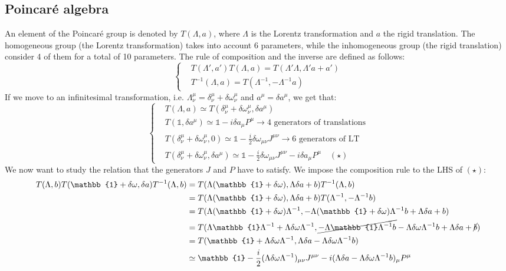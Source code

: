 \documentclass[../main.tex]{subfiles}
\begin{document}
\subsection{Poincaré algebra}
An element of the Poincaré group is denoted by $T(\Lambda,a)$, where $\Lambda$ is the Lorentz transformation and $a$ the rigid translation. The homogeneous group (the Lorentz transformation) takes into account 6 parameters, while the inhomogeneous group (the rigid translation) consider 4 of them for a total of 10 parameters. The rule of composition and the inverse are defined as follows:
\[
\left\{
\begin{aligned}
&T(\Lambda',a')T(\Lambda,a)=T(\Lambda'\Lambda,\Lambda'a+a')\\
&T^{-1}(\Lambda,a)=T(\Lambda^{-1},-\Lambda^{-1}a)
\end{aligned}
\right.
\]
If we move to an infinitesimal transformation, i.e. $\Lambda^{\mu}_{\nu}=\delta^{\mu}_{\nu}+\delta\omega^{\mu}_{\nu}$ and $a^{\mu}=\delta a^{\mu}$, we get that:
\[
\left\{
\begin{aligned}
&T(\Lambda,a)\simeq T(\delta^{\mu}_{\nu}+\delta\omega^{\mu}_{\nu},\delta a^{\mu})\\
&T(\mathbb{1},\delta a^{\mu})\simeq\mathbb{1}-i\delta a_{\mu}P^{\mu}\xrightarrow[]{}\text{4 generators of translations}\\
&T(\delta^{\mu}_{\nu}+\delta\omega^{\mu}_{\nu},0)\simeq\mathbb{1}-\frac{i}{2}
\delta\omega_{\mu\nu}J^{\mu\nu}\xrightarrow[]{}\text{6 generators of LT}\\
&T(\delta^{\mu}_{\nu}+\delta\omega^{\mu}_{\nu},\delta a^{\mu})\simeq\mathbb{1}-\frac{i}{2}\delta\omega_{\mu\nu}J^{\mu\nu}-i\delta a_{\mu}P^{\mu} \quad (\star)
\end{aligned}
\right.
\]
We now want to study the relation that the generators $J$ and $P$ have to satisfy. We impose the composition rule to the LHS of $(\star)$:
\begin{align*}
T(\Lambda,b)T(\mathbb{1}+\delta\omega
,\delta a)T^{-1}(\Lambda,b)&=T(\Lambda(\mathbb{1}+\delta\omega),\Lambda\delta a+b)T^{-1}(\Lambda,b)\\
&=T(\Lambda(\mathbb{1}+\delta\omega),\Lambda\delta a+b)T(\Lambda^{-1},-\Lambda^{-1}b)\\
&=T(\Lambda(\mathbb{1}+\delta\omega)\Lambda^{-1},-\Lambda(\mathbb{1}+\delta\omega)\Lambda^{-1}b+\Lambda\delta a+b)\\
&=T(\Lambda\mathbb{1}\Lambda^{-1}+\Lambda\delta\omega\Lambda^{-1},\cancel{-\Lambda\mathbb{1}\Lambda^{-1}b}-\Lambda\delta\omega\Lambda^{-1}b+\Lambda\delta a+\cancel{b})\\
&=T(\mathbb{1}+\Lambda\delta\omega\Lambda^{-1},\Lambda\delta a-\Lambda\delta\omega\Lambda^{-1}b)\\
&\simeq\mathbb{1}-\frac{i}{2}(\Lambda\delta\omega\Lambda^{-1})_{\mu\nu}J^{\mu\nu}-i(\Lambda\delta a-\Lambda\delta\omega\Lambda^{-1}b)_{\mu}P^{\mu}
\end{align*}
\end{document}
